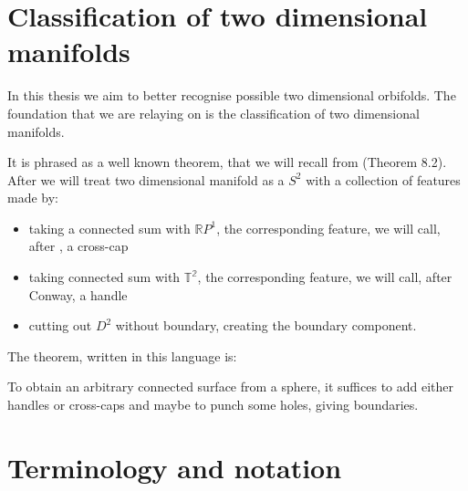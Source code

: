 \section{Classification of two dimensional manifolds}\label{2 dim manifolds}
In this thesis we aim to better recognise possible two dimensional orbifolds. 
The foundation that we are relaying on is the classification of two dimensional manifolds. 

It is phrased as a well known theorem, that we will recall from \cite{Conway2016} (Theorem 8.2).
After \cite{Conway2016} we will treat two dimensional manifold as a $S^2$ with 
a collection of features 
made by:
\begin{itemize}
\item taking a connected sum with $\mathbb{R}P^1$, the corresponding feature, 
we will call, after \cite{Conway2016}, a cross-cap
\item taking connected sum with $\mathbb{T^2}$, the corresponding feature, we will call, 
after Conway, a handle
\item cutting out $D^2$ without boundary, creating the boundary component. 
\end{itemize}
The theorem, written in this language is:
\begin{theorem}
To obtain an
arbitrary connected surface from a sphere, it suffices to add either
handles or cross-caps and maybe to punch some holes, giving
boundaries.
\end{theorem}





\section{Terminology and notation}\label{therminology and notation}

